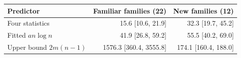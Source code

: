 \begin{tabular}{lrr}\toprule
Predictor & Familiar families (22) & New families (12) \\ \midrule
Four statistics & 15.6 [10.6, 21.9] & 32.3 [19.7, 45.2] \\
Fitted $a n\log n$ & 41.9 [26.8, 59.2] & 55.5 [40.2, 69.0] \\
Upper bound $2m(n-1)$ & 1576.3 [360.4, 3555.8] & 174.1 [160.4, 188.0] \\
\bottomrule\end{tabular}
